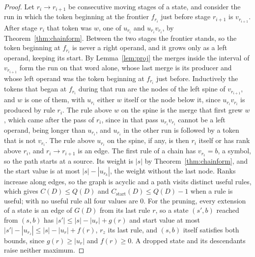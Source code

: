 \documentclass[11pt,a4paper]{article}
\theoremstyle{definition}
\theoremstyle{plain}
\begin{document}
\begin{proof}
Let \(r_i \to r_{i+1}\) be consecutive moving stages of a state, and consider the run in which the token beginning at
the frontier \(f_{r_i}\) just before stage \(r_{i+1}\) is \(v_{r_{i+1}}\). After stage \(r_i\) that token was \(w\), one
of \(u_{r_i}\) and \(u_{r_i} v_{r_i}\), by Theorem~\ref{thm:chainform}. Between the two stages the frontier stands, so
the token beginning at \(f_{r_i}\) is never a right operand, and it grows only as a left operand, keeping its start. By
Lemma~\ref{lem:proj} the merges inside the interval of \(v_{r_{i+1}}\) form the run on that word alone, whose last merge
is its producer and whose left operand was the token beginning at \(f_{r_i}\) just before. Inductively the tokens that
began at \(f_{r_i}\) during that run are the nodes of the left spine of \(v_{r_{i+1}}\), and \(w\) is one of them, with
\(u_{r_i}\) either \(w\) itself or the node below it, since \(u_{r_i} v_{r_i}\) is produced by rule \(r_i\). The rule
above \(w\) on the spine is the merge that first grew \(w\), which came after the pass of \(r_i\), since in that pass
\(u_{r_i} v_{r_i}\) cannot be a left operand, being longer than \(u_{r_i}\), and \(u_{r_i}\) in the other run is
followed by a token that is not \(v_{r_i}\). The rule above \(u_{r_i}\) on the spine, if any, is then \(r_i\) itself or
has rank above \(r_i\), and \(r_i \to r_{i+1}\) is an edge. The first rule of a chain has \(v_{r_1} = b\), a symbol, so
the path starts at a source. Its weight is \(|s|\) by Theorem~\ref{thm:chainform}, and the start value is at most
\(|s| - |u_{r_k}|\), the weight without the last node. Ranks increase along edges, so the graph is acyclic and a path
visits distinct useful rules, which gives \(C(D) \le Q(D)\) and \(C_{\mathrm{start}}(D) \le Q(D) - 1\) when a rule is
useful; with no useful rule all four values are \(0\). For the pruning, every extension of a state is an edge of
\(G(D)\) from its last rule \(r\), so a state \((s', b)\) reached from \((s, b)\) has \(|s'| \le |s| - |u_r| + g(r)\)
and start value at most \(|s'| - |u_{r_z}| \le |s| - |u_r| + f(r)\), \(r_z\) its last rule, and \((s, b)\) itself
satisfies both bounds, since \(g(r) \ge |u_r|\) and \(f(r) \ge 0\). A dropped state and its descendants raise neither
maximum.
\end{proof}

\end{document}

